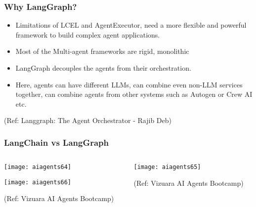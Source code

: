 \begin{frame}[fragile]\frametitle{Why LangGraph?}

\begin{itemize}
\item Limitations of LCEL and AgentExecutor, need a more flexible and powerful framework to build complex agent applications.
\item Most of the Multi-agent frameworks are rigid, monolithic
\item LangGraph decouples the agents from their orchestration.
\item Here, agents can have different LLMs, can combine even non-LLM services together, can combine agents from other systems such as Autogen or Crew AI etc.
\end{itemize}


{\tiny (Ref: Langgraph: The Agent Orchestrator - Rajib Deb)}


\end{frame}


\begin{frame}[fragile]\frametitle{LangChain vs LangGraph}
\begin{columns}
    \begin{column}[T]{0.6\linewidth}
        \begin{center}
        \texttt{[image: aiagents64]}
		
        \texttt{[image: aiagents66]}
		
		{\tiny (Ref: Vizuara AI Agents Bootcamp)}
				
        \end{center}    
    \end{column}
    \begin{column}[T]{0.4\linewidth}
        \begin{center}
        \texttt{[image: aiagents65]}
		
		{\tiny (Ref: Vizuara AI Agents Bootcamp)}
				
        \end{center}    
    \end{column}
  \end{columns}
\end{frame}


